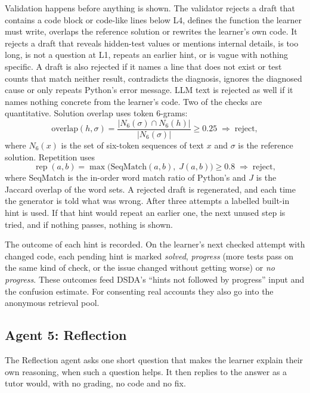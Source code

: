 Validation happens before anything is shown. The validator rejects a draft that contains a code block or code-like lines below L4, defines the function the learner must write, overlaps the reference solution or rewrites the learner's own code. It rejects a draft that reveals hidden-test values or mentions internal details, is too long, is not a question at L1, repeats an earlier hint, or is vague with nothing specific. A draft is also rejected if it names a line that does not exist or test counts that match neither result, contradicts the diagnosis, ignores the diagnosed cause or only repeats Python's error message. LLM text is rejected as well if it names nothing concrete from the learner's code. Two of the checks are quantitative. Solution overlap uses token 6-grams:
\begin{equation}
\text{overlap}(h,\sigma)=\frac{\lvert N_6(\sigma)\cap N_6(h)\rvert}{\lvert N_6(\sigma)\rvert}\geq 0.25\;\Rightarrow\;\text{reject},
\end{equation}
where $N_6(x)$ is the set of six-token sequences of text $x$ and $\sigma$ is the reference solution. Repetition uses
\begin{equation}
\operatorname{rep}(a,b)=\max\big(\text{SeqMatch}(a,b),\;J(a,b)\big)\geq 0.8\;\Rightarrow\;\text{reject},
\end{equation}
where SeqMatch is the in-order word match ratio of Python's  and $J$ is the Jaccard overlap of the word sets. A rejected draft is regenerated, and each time the generator is told what was wrong. After three attempts a labelled built-in hint is used. If that hint would repeat an earlier one, the next unused step is tried, and if nothing passes, nothing is shown.

The outcome of each hint is recorded. On the learner's next checked attempt with changed code, each pending hint is marked \emph{solved}, \emph{progress} (more tests pass on the same kind of check, or the issue changed without getting worse) or \emph{no progress}. These outcomes feed DSDA's ``hints not followed by progress'' input and the confusion estimate. For consenting real accounts they also go into the anonymous retrieval pool.

\subsection{Agent 5: Reflection}
The Reflection agent asks one short question that makes the learner explain their own reasoning, when such a question helps. It then replies to the answer as a tutor would, with no grading, no code and no fix.

